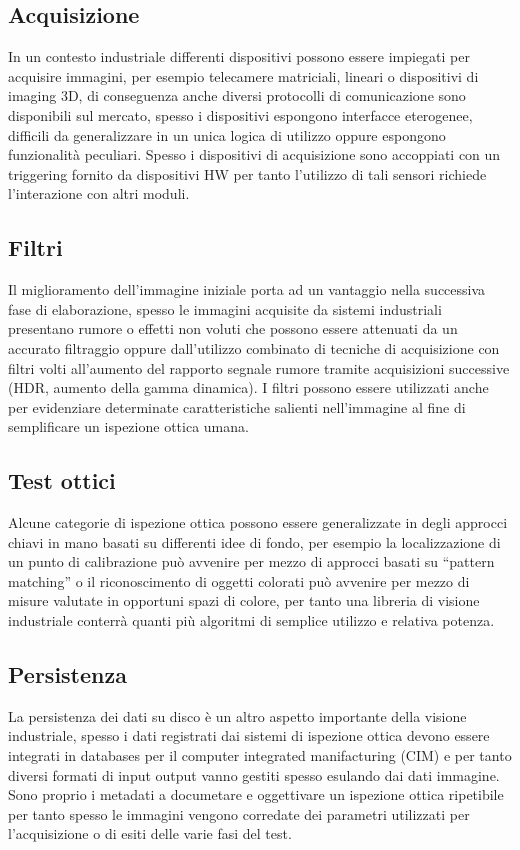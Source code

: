 \subsection{Acquisizione}
In un contesto industriale differenti dispositivi possono essere impiegati per acquisire immagini, per esempio telecamere matriciali, lineari
o dispositivi di imaging 3D, di conseguenza anche diversi protocolli di comunicazione sono disponibili sul mercato, spesso i dispositivi
espongono interfacce eterogenee, difficili da generalizzare in un unica logica di utilizzo oppure espongono funzionalità peculiari. Spesso i dispositivi di acquisizione sono accoppiati con un triggering fornito da dispositivi HW per tanto l'utilizzo di tali sensori richiede l'interazione con altri moduli.

\subsection{Filtri}
Il miglioramento dell'immagine iniziale porta ad un vantaggio nella successiva fase di elaborazione, spesso le immagini acquisite da sistemi industriali presentano rumore o effetti non voluti che possono essere attenuati da un accurato filtraggio oppure dall'utilizzo combinato di tecniche di acquisizione con filtri volti all'aumento del rapporto segnale rumore tramite acquisizioni successive (HDR, aumento della gamma dinamica). I filtri possono essere utilizzati anche per evidenziare determinate caratteristiche salienti nell'immagine al fine di semplificare un ispezione ottica umana.  

\subsection{Test ottici}
Alcune categorie di ispezione ottica possono essere generalizzate in degli approcci chiavi in mano basati su differenti idee di fondo, per esempio la localizzazione di un punto di calibrazione può avvenire per mezzo di approcci basati su ``pattern matching'' o il riconoscimento di oggetti colorati può avvenire per mezzo di misure valutate in opportuni spazi di colore, per tanto una libreria di visione industriale  conterrà quanti più algoritmi di semplice utilizzo e relativa potenza.

\subsection{Persistenza}
La persistenza dei dati su disco è un altro aspetto importante della visione industriale, spesso i dati registrati dai sistemi di ispezione ottica devono essere integrati in databases per il computer integrated manifacturing (CIM) e per tanto diversi formati di input output vanno gestiti spesso esulando dai dati immagine. Sono proprio i metadati a documetare e oggettivare un ispezione ottica ripetibile per tanto spesso le immagini vengono corredate dei parametri utilizzati per l'acquisizione o di esiti delle varie fasi del test.

